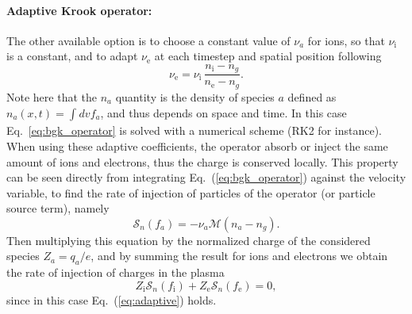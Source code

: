 \documentclass[11pt]{article}
\begin{document}
\paragraph{Adaptive Krook operator:} The other available option is to choose a constant value of $\nu_a$ for ions, so that $\nu_\mathrm{i}$ is a constant, and to adapt $\nu_\mathrm{e}$ at each timestep and spatial position following
%
\begin{equation}\label{eq:adaptive}
\nu_{\mathrm{e}} = \nu_{\mathrm{i}}\, \dfrac{n_\mathrm{i} - n_g}{ n_\mathrm{e} - n_g}. 
\end{equation}
%
Note here that the $n_a$ quantity is the density of species $a$ defined as $n_a (x,t) = \int_{}^{} dv f_a $, and thus depends on space and time. In this case Eq.~\ref{eq:bgk_operator} is solved with a numerical scheme (RK2 for instance). When using these adaptive coefficients, the operator absorb or inject the same amount of ions and electrons, thus the charge is conserved locally. This property can be seen directly from integrating Eq.~(\ref{eq:bgk_operator}) against the velocity variable, to find the rate of injection of particles of the operator (or particle source term), namely
%
\begin{equation}
\mathcal{S}_n(f_a) = - \nu_a \mathcal{M}\left( n_a - n_g \right).   
\end{equation}
%
Then multiplying this equation by the normalized charge of the considered species $Z_a = q_a /e$, and by summing the result for ions and electrons we obtain the rate of injection of charges in the plasma
%
\begin{equation}
  Z_\mathrm{i}\mathcal{S}_n(f_\mathrm{i})  + Z_\mathrm{e}\mathcal{S}_n(f_\mathrm{e})= 0,
\end{equation}
%
since in this case Eq.~(\ref{eq:adaptive}) holds.
\newpage
\printbibliography
\end{document}
